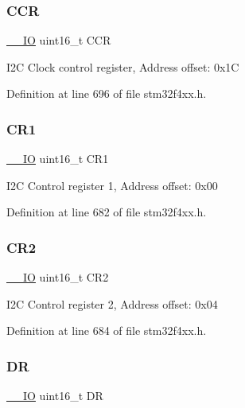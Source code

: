 \subsubsection{\texorpdfstring{C\+CR}{CCR}}
{\footnotesize\ttfamily \hyperlink{group___c_m_s_i_s__core__definitions_gaec43007d9998a0a0e01faede4133d6be}{\+\_\+\+\_\+\+IO} uint16\+\_\+t C\+CR}

I2C Clock control register, Address offset\+: 0x1C 

Definition at line 696 of file stm32f4xx.\+h.

\mbox{\label{struct_i2_c___type_def_a61400ce239355b62aa25c95fcc18a5e1}} 
\subsubsection{\texorpdfstring{C\+R1}{CR1}}
{\footnotesize\ttfamily \hyperlink{group___c_m_s_i_s__core__definitions_gaec43007d9998a0a0e01faede4133d6be}{\+\_\+\+\_\+\+IO} uint16\+\_\+t C\+R1}

I2C Control register 1, Address offset\+: 0x00 

Definition at line 682 of file stm32f4xx.\+h.

\mbox{\label{struct_i2_c___type_def_a2a3e81bd118d1bc52d24a0b0772e6a0c}} 
\subsubsection{\texorpdfstring{C\+R2}{CR2}}
{\footnotesize\ttfamily \hyperlink{group___c_m_s_i_s__core__definitions_gaec43007d9998a0a0e01faede4133d6be}{\+\_\+\+\_\+\+IO} uint16\+\_\+t C\+R2}

I2C Control register 2, Address offset\+: 0x04 

Definition at line 684 of file stm32f4xx.\+h.

\mbox{\label{struct_i2_c___type_def_a0a1acc0425516ff7969709d118b96a3b}} 
\subsubsection{\texorpdfstring{DR}{DR}}
{\footnotesize\ttfamily \hyperlink{group___c_m_s_i_s__core__definitions_gaec43007d9998a0a0e01faede4133d6be}{\+\_\+\+\_\+\+IO} uint16\+\_\+t DR}

